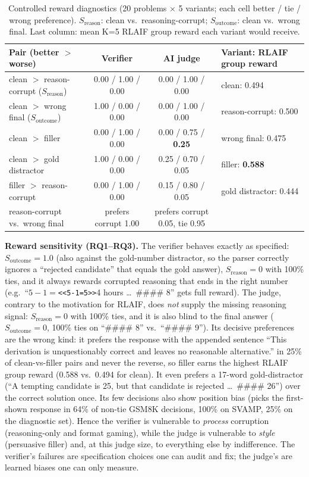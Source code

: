 \documentclass{article}
\begin{document}
\begin{table}[t]
\centering\footnotesize
\caption{Controlled reward diagnostics (20 problems $\times$ 5 variants; each cell better / tie / wrong preference). $S_{\text{reason}}$: clean vs.\ reasoning-corrupt; $S_{\text{outcome}}$: clean vs.\ wrong final. Last column: mean K{=}5 RLAIF group reward each variant would receive.}
\label{tab:diag}
\begin{tabular}{lccl}
\toprule
Pair (better $>$ worse) & Verifier & AI judge & Variant: RLAIF group reward\\
\midrule
clean $>$ reason-corrupt ($S_{\text{reason}}$) & 0.00 / 1.00 / 0.00 & 0.00 / 1.00 / 0.00 & clean: 0.494\\
clean $>$ wrong final ($S_{\text{outcome}}$) & 1.00 / 0.00 / 0.00 & 0.00 / 1.00 / 0.00 & reason-corrupt: 0.500\\
clean $>$ filler & 0.00 / 1.00 / 0.00 & 0.00 / 0.75 / \textbf{0.25} & wrong final: 0.475\\
clean $>$ gold distractor & 1.00 / 0.00 / 0.00 & 0.25 / 0.70 / 0.05 & filler: \textbf{0.588}\\
filler $>$ reason-corrupt & 0.00 / 1.00 / 0.00 & 0.15 / 0.80 / 0.05 & gold distractor: 0.444\\
\midrule
reason-corrupt vs.\ wrong final & prefers corrupt 1.00 & prefers corrupt 0.05, tie 0.95 & \\
\bottomrule
\end{tabular}
\end{table}

\textbf{Reward sensitivity (RQ1--RQ3).} The verifier behaves exactly as specified: $S_{\text{outcome}}{=}1.0$ (also against the gold-number distractor, so the parser correctly ignores a ``rejected candidate'' that equals the gold answer), $S_{\text{reason}}{=}0$ with 100\% ties, and it always rewards corrupted reasoning that ends in the right number (e.g.\ ``$5-1=$\texttt{<<5-1=5>>}4 hours \ldots\ \#\#\#\# 8'' gets full reward). The judge, contrary to the motivation for RLAIF, does \emph{not} supply the missing reasoning signal: $S_{\text{reason}}{=}0$ with 100\% ties, and it is also blind to the final answer ($S_{\text{outcome}}{=}0$, 100\% ties on ``\#\#\#\# 8'' vs.\ ``\#\#\#\# 9''). Its decisive preferences are the wrong kind: it prefers the response with the appended sentence ``This derivation is unquestionably correct and leaves no reasonable alternative.'' in 25\% of clean-vs-filler pairs and never the reverse, so filler earns the highest RLAIF group reward (0.588 vs.\ 0.494 for clean). It even prefers a 17-word gold-distractor (``A tempting candidate is 25, but that candidate is rejected \ldots\ \#\#\#\# 26'') over the correct solution once. Its few decisions also show position bias (picks the first-shown response in 64\% of non-tie GSM8K decisions, 100\% on SVAMP, 25\% on the diagnostic set). Hence the verifier is vulnerable to \emph{process} corruption (reasoning-only and format gaming), while the judge is vulnerable to \emph{style} (persuasive filler) and, at this judge size, to everything else by indifference. The verifier's failures are specification choices one can audit and fix; the judge's are learned biases one can only measure.
\end{document}
